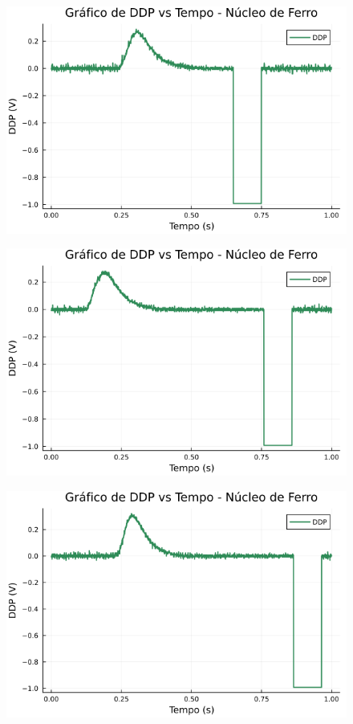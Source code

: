 \begin{center}
\begin{multicols}{2}
\begin{figure}[H]
    \centering
    \includegraphics[width=1.0\linewidth]{figuras/grafico_dados3_F0006CH1.png}
\end{figure}

\begin{figure}[H]
    \centering
    \includegraphics[width=1.0\linewidth]{figuras/grafico_dados3_F0007CH1.png}
\end{figure}

\begin{figure}[H]
    \centering
    \includegraphics[width=1.0\linewidth]{figuras/grafico_dados3_F0008CH1.png}
\end{figure}


\end{multicols}
\end{center}
